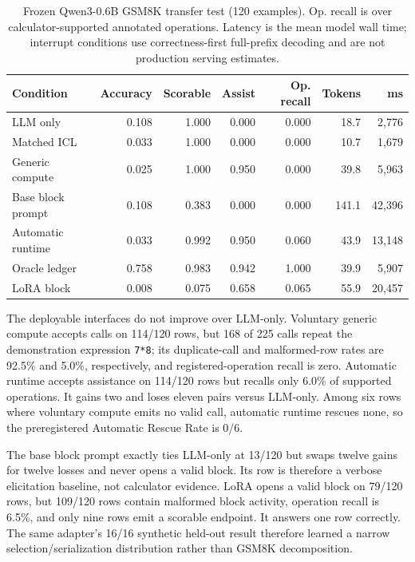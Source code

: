 \documentclass[11pt]{article}
\begin{document}
\begin{table}[t]
\centering
\small
\caption{Frozen Qwen3-0.6B GSM8K transfer test (120 examples). Op. recall is
over calculator-supported annotated operations. Latency is the mean model wall
time; interrupt conditions use correctness-first full-prefix decoding and are
not production serving estimates.}
\label{tab:gsm8k-transfer}
\begin{tabular}{@{}lrrrrrr@{}}
\toprule
Condition & Accuracy & Scorable & Assist & Op. recall & Tokens & ms \\
\midrule
LLM only          & 0.108 & 1.000 & 0.000 & 0.000 & 18.7  & 2,776 \\
Matched ICL       & 0.033 & 1.000 & 0.000 & 0.000 & 10.7  & 1,679 \\
Generic compute   & 0.025 & 1.000 & 0.950 & 0.000 & 39.8  & 5,963 \\
Base block prompt & 0.108 & 0.383 & 0.000 & 0.000 & 141.1 & 42,396 \\
Automatic runtime & 0.033 & 0.992 & 0.950 & 0.060 & 43.9  & 13,148 \\
Oracle ledger     & 0.758 & 0.983 & 0.942 & 1.000 & 39.9  & 5,907 \\
LoRA block        & 0.008 & 0.075 & 0.658 & 0.065 & 55.9  & 20,457 \\
\bottomrule
\end{tabular}
\end{table}

The deployable interfaces do not improve over LLM-only. Voluntary generic
compute accepts calls on 114/120 rows, but 168 of 225 calls repeat the
demonstration expression \texttt{7*8}; its duplicate-call and malformed-row rates
are 92.5\% and 5.0\%, respectively, and registered-operation recall is zero.
Automatic runtime accepts assistance on 114/120 rows but recalls only 6.0\% of
supported operations. It gains two and loses eleven pairs versus LLM-only.
Among six rows where voluntary compute emits no valid call, automatic runtime
rescues none, so the preregistered Automatic Rescue Rate is 0/6.

The base block prompt exactly ties LLM-only at 13/120 but swaps twelve gains for
twelve losses and never opens a valid block. Its row is therefore a verbose
elicitation baseline, not calculator evidence. LoRA opens a valid block on
79/120 rows, but 109/120 rows contain malformed block activity, operation recall
is 6.5\%, and only nine rows emit a scorable endpoint. It answers one row
correctly. The same adapter's 16/16 synthetic held-out result therefore learned a
narrow selection/serialization distribution rather than GSM8K decomposition.
\end{document}
